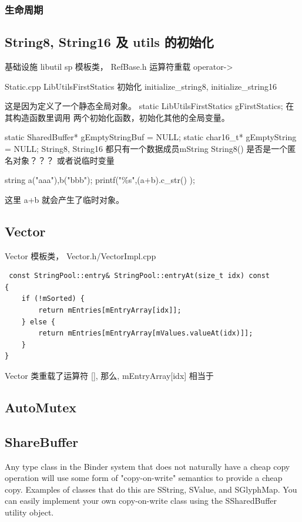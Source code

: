 \documentclass[a4paper,11pt]{article}
\begin{document}
\subsubsection{生命周期}


\subsection{ String8, String16 及 utils 的初始化 }
基础设施 libutil 
sp 模板类， RefBase.h    运算符重载 operator->

Static.cpp  LibUtilsFirstStatics   初始化 initialize_string8,
initialize_string16 

这是因为定义了一个静态全局对象。
static LibUtilsFirstStatics gFirstStatics;
在其构造函数里调用 两个初始化函数，初始化其他的全局变量。 

static SharedBuffer* gEmptyStringBuf = NULL;
static char16_t* gEmptyString = NULL;
String8, String16 都只有一个数据成员mString
String8() 是否是一个匿名对象？？？  或者说临时变量

 string a("aaa"),b("bbb");
 printf("\%s",(a+b).c_str() );

 这里 a+b 就会产生了临时对象。



\subsection{Vector}
Vector 模板类， Vector.h/VectorImpl.cpp
\begin{lstlisting}
 const StringPool::entry& StringPool::entryAt(size_t idx) const
{
    if (!mSorted) {
        return mEntries[mEntryArray[idx]];
    } else {
        return mEntries[mEntryArray[mValues.valueAt(idx)]];
    }
}
\end{lstlisting}

Vector 类重载了运算符 [], 那么,  mEntryArray[idx] 相当于 

\subsection{AutoMutex}

\subsection{ShareBuffer}
Any type class in the Binder system that does not naturally have a cheap copy operation will use some form of "copy-on-write" semantics to provide a cheap copy. Examples of classes that do this are SString, SValue, and SGlyphMap. You can easily implement your own copy-on-write class using the SSharedBuffer utility object.
\end{document}
